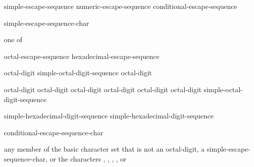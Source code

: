 \begin{bnf}
\br
    simple-escape-sequence\br
    numeric-escape-sequence\br
    conditional-escape-sequence
\end{bnf}

\begin{bnf}
\br
    \terminal{\textbackslash} simple-escape-sequence-char
\end{bnf}

\begin{bnf}
 \textnormal{one of}\br
\end{bnf}

\begin{bnf}
\br
    octal-escape-sequence\br
    hexadecimal-escape-sequence
\end{bnf}

\begin{bnf}
\br
    octal-digit\br
    simple-octal-digit-sequence octal-digit
\end{bnf}

\begin{bnf}
\br
    \terminal{\textbackslash} octal-digit\br
    \terminal{\textbackslash} octal-digit octal-digit\br
    \terminal{\textbackslash} octal-digit octal-digit octal-digit\br
     simple-octal-digit-sequence \terminal{\}}\br
\end{bnf}

\begin{bnf}
\br
     simple-hexadecimal-digit-sequence\br
     simple-hexadecimal-digit-sequence \terminal{\}}
\end{bnf}

\begin{bnf}
\br
    \terminal{\textbackslash} conditional-escape-sequence-char
\end{bnf}

\begin{bnf}
\br
    \textnormal{any member of the basic character set that is not an} octal-digit\textnormal{, a} simple-escape-sequence-char\textnormal{, or the characters , , , , or }
\end{bnf}

